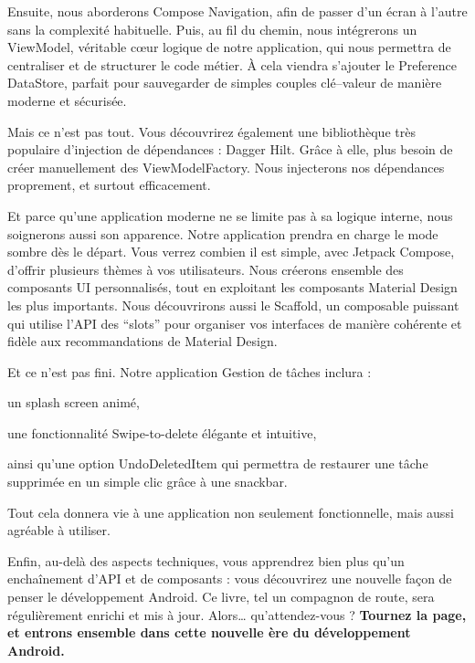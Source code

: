 Ensuite, nous aborderons Compose Navigation, afin de passer d’un écran à l’autre sans la complexité habituelle.
Puis, au fil du chemin, nous intégrerons un ViewModel, véritable cœur logique de notre application, qui nous permettra de centraliser et de structurer le code métier.
À cela viendra s’ajouter le Preference DataStore, parfait pour sauvegarder de simples couples clé–valeur de manière moderne et sécurisée.

Mais ce n’est pas tout. Vous découvrirez également une bibliothèque très populaire d’injection de dépendances : Dagger Hilt. Grâce à elle, plus besoin de créer manuellement des ViewModelFactory. Nous injecterons nos dépendances proprement, et surtout efficacement.

Et parce qu’une application moderne ne se limite pas à sa logique interne, nous soignerons aussi son apparence.
Notre application prendra en charge le mode sombre dès le départ. Vous verrez combien il est simple, avec Jetpack Compose, d’offrir plusieurs thèmes à vos utilisateurs.
Nous créerons ensemble des composants UI personnalisés, tout en exploitant les composants Material Design les plus importants.
Nous découvrirons aussi le Scaffold, un composable puissant qui utilise l’API des “slots” pour organiser vos interfaces de manière cohérente et fidèle aux recommandations de Material Design.

Et ce n’est pas fini. Notre application  Gestion de tâches inclura :

un splash screen animé,

une fonctionnalité Swipe-to-delete élégante et intuitive,

ainsi qu’une option UndoDeletedItem qui permettra de restaurer une tâche supprimée en un simple clic grâce à une snackbar.

Tout cela donnera vie à une application non seulement fonctionnelle, mais aussi agréable à utiliser.

Enfin, au-delà des aspects techniques, vous apprendrez bien plus qu’un enchaînement d’API et de composants : vous découvrirez une nouvelle façon de penser le développement Android.
Ce livre, tel un compagnon de route, sera régulièrement enrichi et mis à jour.
Alors… qu’attendez-vous ?
\textbf{Tournez la page, et entrons ensemble dans cette nouvelle ère du développement Android.}